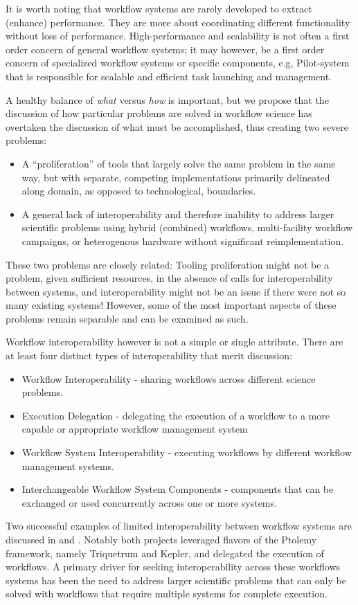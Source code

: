 It is worth noting that workflow systems are rarely developed to extract
(enhance) performance. They are more about coordinating different
functionality without loss of performance. High-performance and scalability is
not often a first order concern of general workflow systems; it may however,
be a first order concern of specialized workflow systems or specific
components, e.g, Pilot-system that is responsible for scalable and efficient
task launching and management.

A healthy balance of \textit{what} versus \textit{how} is
important, but we propose that the discussion of how particular problems are
solved in workflow science has overtaken the discussion of what must be
accomplished, thus creating two severe problems: \begin{itemize} \item A
``proliferation'' of tools that largely solve the same problem in the same way,
but with separate, competing implementations primarily delineated along domain,
as opposed to technological, boundaries.  \item A general lack of
interoperability and therefore inability to address larger scientific problems
using hybrid (combined) workflows, multi-facility workflow campaigns, or
heterogenous hardware without significant reimplementation.  \end{itemize}

These two problems are closely related: Tooling proliferation might not be a
problem, given sufficient resources, in the absence of calls for
interoperability between systems, and interoperability might not be an issue if
there were not so many existing systems! However, some of the most important
aspects of these problems remain separable and can be examined as such.

Workflow interoperability however is not a simple or single attribute. There
are at least four distinct types of interoperability that merit discussion:
\begin{itemize} \item Workflow Interoperability - sharing workflows across
different science problems.  \item Execution Delegation - delegating the
execution of a workflow to a more capable or appropriate workflow management
system \item Workflow System Interoperability - executing workflows by
different workflow management systems.  \item Interchangeable Workflow System
Components - components that can be exchanged or used concurrently across one
or more systems.  \end{itemize} Two successful examples of limited
interoperability between workflow systems are discussed in
\cite{brooks_triquetrum:_2015} and \cite{mandal_integrating_2007}. Notably
both projects leveraged flavors of the Ptolemy framework, namely Triquetrum
and Kepler, and delegated the execution of workflows. A primary driver for
seeking interoperability across these workflows systems has been the need to
address larger scientific problems that can only be solved with workflows that
require multiple systems for complete execution.






